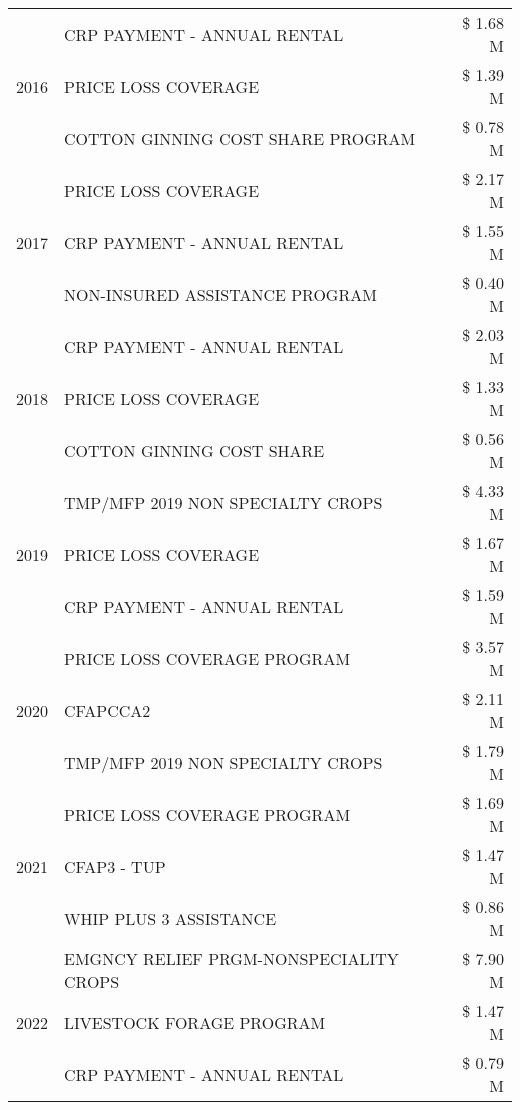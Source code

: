 \begin{tabular}{llr}
\cline{1-3}
\multirow[t]{3}{*}{2016} & CRP PAYMENT - ANNUAL RENTAL & \$ 1.68 M \\
 & PRICE LOSS COVERAGE & \$ 1.39 M \\
 & COTTON GINNING COST SHARE PROGRAM & \$ 0.78 M \\
\cline{1-3}
\multirow[t]{3}{*}{2017} & PRICE LOSS COVERAGE & \$ 2.17 M \\
 & CRP PAYMENT - ANNUAL RENTAL & \$ 1.55 M \\
 & NON-INSURED ASSISTANCE PROGRAM & \$ 0.40 M \\
\cline{1-3}
\multirow[t]{3}{*}{2018} & CRP PAYMENT - ANNUAL RENTAL & \$ 2.03 M \\
 & PRICE LOSS COVERAGE & \$ 1.33 M \\
 & COTTON GINNING COST SHARE & \$ 0.56 M \\
\cline{1-3}
\multirow[t]{3}{*}{2019} & TMP/MFP 2019 NON SPECIALTY CROPS & \$ 4.33 M \\
 & PRICE LOSS COVERAGE & \$ 1.67 M \\
 & CRP PAYMENT - ANNUAL RENTAL & \$ 1.59 M \\
\cline{1-3}
\multirow[t]{3}{*}{2020} & PRICE LOSS COVERAGE PROGRAM & \$ 3.57 M \\
 & CFAPCCA2 & \$ 2.11 M \\
 & TMP/MFP 2019 NON SPECIALTY CROPS & \$ 1.79 M \\
\cline{1-3}
\multirow[t]{3}{*}{2021} & PRICE LOSS COVERAGE PROGRAM & \$ 1.69 M \\
 & CFAP3 - TUP & \$ 1.47 M \\
 & WHIP PLUS 3 ASSISTANCE & \$ 0.86 M \\
\cline{1-3}
\multirow[t]{3}{*}{2022} & EMGNCY RELIEF PRGM-NONSPECIALITY CROPS & \$ 7.90 M \\
 & LIVESTOCK FORAGE PROGRAM & \$ 1.47 M \\
 & CRP PAYMENT - ANNUAL RENTAL & \$ 0.79 M \\
\cline{1-3}
\bottomrule
\end{tabular}

